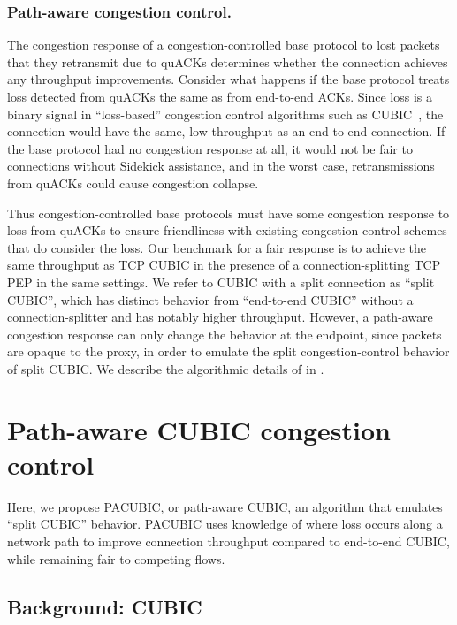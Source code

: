 
\subsubsection{Path-aware congestion control.}

The congestion response of a congestion-controlled base protocol to lost packets
that they retransmit due to quACKs determines whether the connection achieves
any throughput improvements. Consider what happens if the base protocol treats
loss detected from quACKs the same as from end-to-end ACKs. Since loss is a
binary signal in ``loss-based'' congestion control algorithms such as
CUBIC~\cite{ha2008cubic}, the connection would have the same, low throughput as
an end-to-end connection. If the base protocol had no congestion response at
all, it would not be fair to connections without Sidekick assistance, and in
the worst case, retransmissions from quACKs could cause congestion collapse.

Thus congestion-controlled base protocols must have some congestion response to
loss from quACKs to ensure friendliness with existing congestion control
schemes that do consider the loss. Our benchmark for a fair response is to
achieve the same throughput as TCP CUBIC in the presence of a
connection-splitting TCP PEP in the same settings. We refer to CUBIC with a
split connection as ``split CUBIC'', which has distinct behavior from
``end-to-end CUBIC'' without a connection-splitter and has notably higher
throughput. However, a path-aware congestion response can only change the
behavior at the endpoint, since packets are opaque to the proxy, in order to
emulate the split congestion-control behavior of split CUBIC. We describe
the algorithmic details of in .

\section{Path-aware CUBIC congestion control}
\label{sec:sidekick:pacubic}

Here, we propose PACUBIC, or path-aware CUBIC, an algorithm that emulates
``split CUBIC'' behavior. PACUBIC uses knowledge of where loss occurs along a
network path to improve connection
throughput compared to end-to-end CUBIC, while remaining fair to competing flows.

\subsection{Background: CUBIC}

